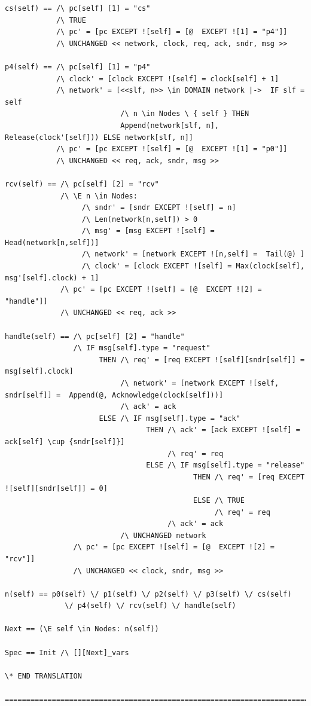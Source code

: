 \documentclass{thesul}
\newcommand{\tlaplus}{TLA\textsuperscript{+}\xspace}
\begin{document}
\begin{appendices}
\begin{lstlisting}[caption = \tlaplus translation for Sub-Processes, frame = tlrb, firstnumber = 1]
cs(self) == /\ pc[self] [1] = "cs"
            /\ TRUE
            /\ pc' = [pc EXCEPT ![self] = [@  EXCEPT ![1] = "p4"]]
            /\ UNCHANGED << network, clock, req, ack, sndr, msg >>

p4(self) == /\ pc[self] [1] = "p4"
            /\ clock' = [clock EXCEPT ![self] = clock[self] + 1]
            /\ network' = [<<slf, n>> \in DOMAIN network |->  IF slf = self 
                           /\ n \in Nodes \ { self } THEN 
                           Append(network[slf, n], Release(clock'[self])) ELSE network[slf, n]]
            /\ pc' = [pc EXCEPT ![self] = [@  EXCEPT ![1] = "p0"]]
            /\ UNCHANGED << req, ack, sndr, msg >>

rcv(self) == /\ pc[self] [2] = "rcv"
             /\ \E n \in Nodes:
                  /\ sndr' = [sndr EXCEPT ![self] = n]
                  /\ Len(network[n,self]) > 0 
                  /\ msg' = [msg EXCEPT ![self] = Head(network[n,self])]
                  /\ network' = [network EXCEPT ![n,self] =  Tail(@) ]
                  /\ clock' = [clock EXCEPT ![self] = Max(clock[self], msg'[self].clock) + 1]
             /\ pc' = [pc EXCEPT ![self] = [@  EXCEPT ![2] = "handle"]]
             /\ UNCHANGED << req, ack >>

handle(self) == /\ pc[self] [2] = "handle"
                /\ IF msg[self].type = "request"
                      THEN /\ req' = [req EXCEPT ![self][sndr[self]] = msg[self].clock]
                           /\ network' = [network EXCEPT ![self, sndr[self]] =  Append(@, Acknowledge(clock[self]))]
                           /\ ack' = ack
                      ELSE /\ IF msg[self].type = "ack"
                                 THEN /\ ack' = [ack EXCEPT ![self] = ack[self] \cup {sndr[self]}]
                                      /\ req' = req
                                 ELSE /\ IF msg[self].type = "release"
                                            THEN /\ req' = [req EXCEPT ![self][sndr[self]] = 0]
                                            ELSE /\ TRUE
                                                 /\ req' = req
                                      /\ ack' = ack
                           /\ UNCHANGED network
                /\ pc' = [pc EXCEPT ![self] = [@  EXCEPT ![2] = "rcv"]]
                /\ UNCHANGED << clock, sndr, msg >>

n(self) == p0(self) \/ p1(self) \/ p2(self) \/ p3(self) \/ cs(self)
              \/ p4(self) \/ rcv(self) \/ handle(self)

Next == (\E self \in Nodes: n(self))

Spec == Init /\ [][Next]_vars

\* END TRANSLATION

=============================================================================

\end{lstlisting}

\end{appendices}



\end{document}
